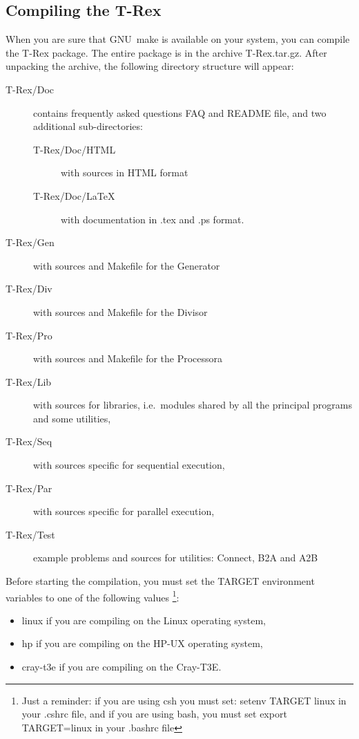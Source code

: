 \documentclass[10pt]{article}
\newcommand*{\tc}{\ttfamily} %
\newcommand*{\tn}{\sffamily} %
\begin{document}
    \subsection{Compiling the {\tn T-Rex}}

    When you are sure that GNU~make is available on your system,
    you can compile the {\tn T-Rex} package. The entire package
    is in the archive {\tc T-Rex.tar.gz}. 
    After unpacking the archive, the following directory 
    structure will appear:    
    \begin{description}
    \item[{\tc T-Rex/Doc}] contains frequently asked questions
          FAQ and README file, and two additional 
          sub-directories: 
       \begin{description}
       \item[{\tc T-Rex/Doc/HTML}] with sources in HTML format
       \item[{\tc T-Rex/Doc/LaTeX}] with documentation in .tex and .ps format.
       \end{description} 
    \item[{\tc T-Rex/Gen}] with sources and {\tc Makefile} for the {\tn Generator}
    \item[{\tc T-Rex/Div}] with sources and {\tc Makefile} for the {\tn Divisor} 
    \item[{\tc T-Rex/Pro}] with sources and {\tc Makefile} for the {\tn Processor}a
    \item[{\tc T-Rex/Lib}] with sources for libraries, i.e.\ modules shared
          by all the principal programs and some utilities,
    \item[{\tc T-Rex/Seq}] with sources specific for sequential execution,
    \item[{\tc T-Rex/Par}] with sources specific for parallel execution,
    \item[{\tc T-Rex/Test}] example problems and sources for utilities:
          {\tn Connect}, {\tn B2A} and {\tn A2B} 
    \end{description}
    Before starting the compilation, you must set the {\tc TARGET}
    environment variables to one of the following values
     \footnote{Just a reminder: if you are using csh you must set: 
               {\tc setenv TARGET linux} in your {\tc .cshrc} file, and if 
               you are using {\tc bash}, you must set {\tc export TARGET=linux}
               in your {.bashrc} file}:
    \begin{itemize} 
    \item {\tc linux} if you are compiling on the Linux operating
          system,
    \item {\tc hp} if you are compiling on the HP-UX operating
          system,
    \item {\tc cray-t3e} if you are compiling on the \mbox{Cray-T3E}.
    \end{itemize} 
\end{document}

